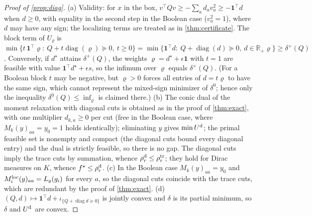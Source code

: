 \documentclass[a4paper,11pt]{article}
\theoremstyle{plain}
\theoremstyle{definition}
\theoremstyle{remark}
\newcommand{\R}{\mathbb{R}}
\newcommand{\diag}{\operatorname{diag}}
\begin{document}
\begin{proof}[Proof of \cref{prop:diag}]
(a) Validity: for $x$ in the box, $v^\top Qv\ge-\sum_ad_av_a^2\ge-\mathbf 1^\top d$ when $d\ge0$, with equality in the second step in the Boolean case ($v_a^2=1$), where $d$ may have any sign; the localizing terms are treated as in \cref{thm:certificate}. The block term of $U_\varrho$ is $\min\{t\,\mathbf 1^\top\varrho:\ Q+t\diag(\varrho)\succeq0,\ t\ge0\}=\min\{\mathbf 1^\top d:\ Q+\diag(d)\succeq0,\ d\in\R_+\varrho\}\ge\delta^+(Q)$. Conversely, if $d^\star$ attains $\delta^+(Q)$, the weights $\varrho=d^\star+\epsilon\mathbf1$ with $t=1$ are feasible with value $\mathbf 1^\top d^\star+\epsilon s$, so the infimum over $\varrho$ equals $\delta^+(Q)$. (For a Boolean block $t$ may be negative, but $\varrho>0$ forces all entries of $d=t\varrho$ to have the same sign, which cannot represent the mixed-sign minimizer of $\delta^0$; hence only the inequality $\delta^0(Q)\le\inf_\varrho$ is claimed there.) (b) The conic dual of the moment relaxation with diagonal cuts is obtained as in the proof of \cref{thm:exact}, with one multiplier $d_{k,a}\ge0$ per cut (free in the Boolean case, where $M_k(y)_{aa}=y_0=1$ holds identically); eliminating $y$ gives $\min U^{\rm d}$; the primal feasible set is nonempty and compact (the diagonal cuts bound every diagonal entry) and the dual is strictly feasible, so there is no gap. The diagonal cuts imply the trace cuts by summation, whence $\rho_r^{\rm d}\le\rho_r^{\rm tr}$; they hold for Dirac measures on $K$, whence $f^\star\le\rho_r^{\rm d}$. (c) In the Boolean case $M_k(y)_{aa}=y_0$ and $M_i^{\rm loc}(y)_{aa}=L_y(g_i)$ for every $a$, so the diagonal cuts coincide with the trace cuts, which are redundant by the proof of \cref{thm:exact}. (d) $(Q,d)\mapsto\mathbf 1^\top d+\iota_{\{Q+\diag d\succeq0\}}$ is jointly convex and $\delta$ is its partial minimum, so $\delta$ and $U^{\rm d}$ are convex.
\end{proof}
\end{document}

